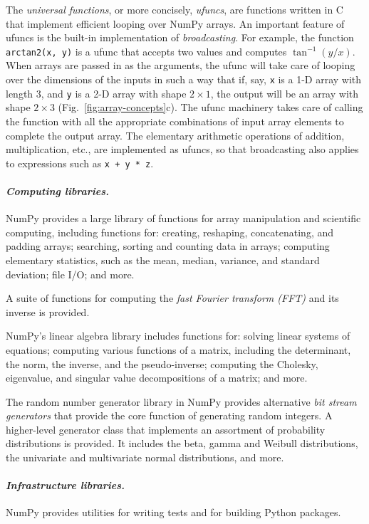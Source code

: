 \documentclass[twocolumn]{article}
\begin{document}
The \emph{universal functions}, or more concisely, \emph{ufuncs},
are functions written in C that implement efficient looping over
NumPy arrays. An important feature of ufuncs is the built-in
implementation of \emph{broadcasting}.  For example, the function
\texttt{arctan2(x, y)} is a ufunc that accepts two values and computes
$\tan^{-1}(y/x)$.  When arrays are passed in as the arguments,
the ufunc will take care of looping over the dimensions of the inputs
in such a way that if, say, \texttt{x} is a 1-D array with length 3, and
\texttt{y} is a 2-D array with shape $2 \times 1$, the output will be
an array with shape $2 \times 3$ (Fig.~\ref{fig:array-concepts}c).
The ufunc machinery takes care
of calling the function with all the appropriate combinations of
input array elements to complete the output array.
The elementary arithmetic operations of addition, multiplication, etc.,
are implemented as ufuncs, so that broadcasting also applies to expressions
such as \texttt{x + y * z}.

\paragraph{\emph{Computing libraries.}}
NumPy provides a large library of functions for array manipulation
and scientific computing, including functions for: creating, reshaping,
concatenating, and padding arrays; searching, sorting and counting data
in arrays; computing elementary statistics, such as the mean, median,
variance, and standard deviation; file I/O; and more.

A suite of functions for computing the \emph{fast Fourier transform (FFT)}
and its inverse is provided.

NumPy's linear algebra library includes functions for: solving linear
systems of equations; computing various functions of a matrix, including
the determinant, the norm, the inverse, and the pseudo-inverse;
computing the Cholesky, eigenvalue, and singular value decompositions of a matrix;
and more.

The random number generator library in NumPy provides alternative
\emph{bit stream generators} that provide the core function of generating
random integers.
A higher-level generator class that implements an assortment of
probability distributions is provided. It includes the beta, gamma
and Weibull distributions, the univariate and multivariate normal
distributions, and more.

\paragraph{\emph{Infrastructure libraries.}} NumPy provides utilities
for writing tests and for building Python packages.
\end{document}
